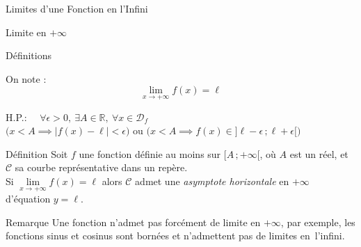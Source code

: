 \documentclass{coursbook}
\begin{document}
\begin{Gpartie}{Limites d'une Fonction en l'Infini}
\begin{Spartie}{Limite en $+\infty$}
\begin{SSpartie}{Définitions}
\begin{itemize}
                    On note : \[\boxed{\lim\limits_{x\to +\infty}f(x)=\ell}\]
                    \begin{center}
                        \parbox{\linewidth}{}
                    \end{center}
                    \vspace*{2ex}
                    H.P.: $\quad\forall\epsilon >0,~\exists A\in\mathbb{R},~\forall x\in\mathcal{D}_f$ \\ \phantom{H.P.: \quad}$\bigg(x<A\implies\left\lvert f(x)-\ell\right\rvert <\epsilon\bigg)$ ou $\bigg(x<A\implies f(x)\in\big]\ell-\epsilon\,;\ell+\epsilon\big[\bigg)$
                \end{itemize}
            \end{SSpartie}
            \begin{SSpartie}{Définition} 
                Soit $f$ une fonction définie au moins sur $\big[A\,;+\infty\big[$, où $A$ est un réel, et $\mathcal{C}$ sa courbe représentative dans un repère. \\ Si $\lim\limits_{x\to+\infty}f(x)=\ell$ alors $\mathcal{C}$ admet une \emph{asymptote horizontale} en $+\infty$ \\ d'équation $y=\ell$.
            \end{SSpartie}
            \begin{SSpartie}{Remarque} 
                Une fonction n'admet pas forcément de limite en $+\infty$, par exemple, les fonctions sinus et cosinus sont bornées et n'admettent pas de limites en~l'infini.
            \end{SSpartie}
        \end{Spartie}

\end{Gpartie}
\end{document}
